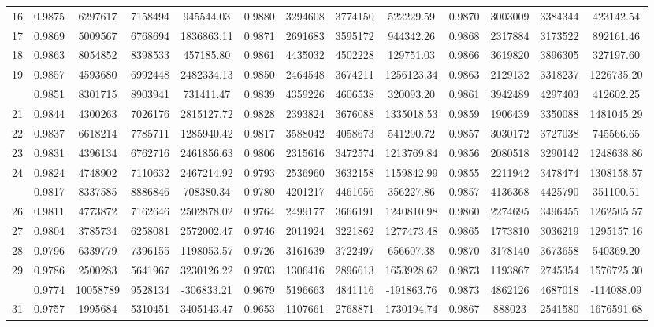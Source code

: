\documentclass[
  12pt,
]{article}
\begin{document}
\begin{longtable}[t]{lcccccccccccc}
16 & 0.9875 & 6297617 & 7158494 & 945544.03 & 0.9880 & 3294608 & 3774150 & 522229.59 & 0.9870 & 3003009 & 3384344 & 423142.54\\
17 & 0.9869 & 5009567 & 6768694 & 1836863.11 & 0.9871 & 2691683 & 3595172 & 944342.26 & 0.9868 & 2317884 & 3173522 & 892161.46\\
18 & 0.9863 & 8054852 & 8398533 & 457185.80 & 0.9861 & 4435032 & 4502228 & 129751.03 & 0.9866 & 3619820 & 3896305 & 327197.60\\
19 & 0.9857 & 4593680 & 6992448 & 2482334.13 & 0.9850 & 2464548 & 3674211 & 1256123.34 & 0.9863 & 2129132 & 3318237 & 1226735.20\\
\addlinespace
20 & 0.9851 & 8301715 & 8903941 & 731411.47 & 0.9839 & 4359226 & 4606538 & 320093.20 & 0.9861 & 3942489 & 4297403 & 412602.25\\
21 & 0.9844 & 4300263 & 7026176 & 2815127.72 & 0.9828 & 2393824 & 3676088 & 1335018.53 & 0.9859 & 1906439 & 3350088 & 1481045.29\\
22 & 0.9837 & 6618214 & 7785711 & 1285940.42 & 0.9817 & 3588042 & 4058673 & 541290.72 & 0.9857 & 3030172 & 3727038 & 745566.65\\
23 & 0.9831 & 4396134 & 6762716 & 2461856.63 & 0.9806 & 2315616 & 3472574 & 1213769.84 & 0.9856 & 2080518 & 3290142 & 1248638.86\\
24 & 0.9824 & 4748902 & 7110632 & 2467214.92 & 0.9793 & 2536960 & 3632158 & 1159842.99 & 0.9855 & 2211942 & 3478474 & 1308158.57\\
\addlinespace
25 & 0.9817 & 8337585 & 8886846 & 708380.34 & 0.9780 & 4201217 & 4461056 & 356227.86 & 0.9857 & 4136368 & 4425790 & 351100.51\\
26 & 0.9811 & 4773872 & 7162646 & 2502878.02 & 0.9764 & 2499177 & 3666191 & 1240810.98 & 0.9860 & 2274695 & 3496455 & 1262505.57\\
27 & 0.9804 & 3785734 & 6258081 & 2572002.47 & 0.9746 & 2011924 & 3221862 & 1277473.48 & 0.9865 & 1773810 & 3036219 & 1295157.16\\
28 & 0.9796 & 6339779 & 7396155 & 1198053.57 & 0.9726 & 3161639 & 3722497 & 656607.38 & 0.9870 & 3178140 & 3673658 & 540369.20\\
29 & 0.9786 & 2500283 & 5641967 & 3230126.22 & 0.9703 & 1306416 & 2896613 & 1653928.62 & 0.9873 & 1193867 & 2745354 & 1576725.30\\
\addlinespace
30 & 0.9774 & 10058789 & 9528134 & -306833.21 & 0.9679 & 5196663 & 4841116 & -191863.76 & 0.9873 & 4862126 & 4687018 & -114088.09\\
31 & 0.9757 & 1995684 & 5310451 & 3405143.47 & 0.9653 & 1107661 & 2768871 & 1730194.74 & 0.9867 & 888023 & 2541580 & 1676591.68\\

\end{longtable}
\end{document}

